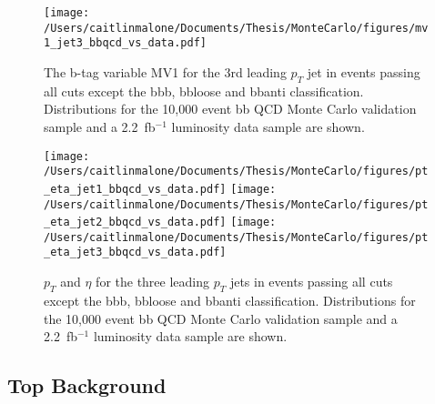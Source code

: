 \begin{figure}
  \texttt{[image: /Users/caitlinmalone/Documents/Thesis/MonteCarlo/figures/mv1\_jet3\_bbqcd\_vs\_data.pdf]}
  \caption{The b-tag variable MV1 for the 3rd leading $p_T$ jet in events passing all cuts except the
bbb, bbloose and bbanti classification.     Distributions for the 10,000 event bb QCD Monte Carlo validation sample
and a 2.2~fb$^{-1}$ luminosity data sample are shown.    \label{fig:mv1_jet3_bbqcd_vs_data}}
\end{figure}




\begin{figure}
  \texttt{[image: /Users/caitlinmalone/Documents/Thesis/MonteCarlo/figures/pt\_eta\_jet1\_bbqcd\_vs\_data.pdf]}
  \texttt{[image: /Users/caitlinmalone/Documents/Thesis/MonteCarlo/figures/pt\_eta\_jet2\_bbqcd\_vs\_data.pdf]}
  \texttt{[image: /Users/caitlinmalone/Documents/Thesis/MonteCarlo/figures/pt\_eta\_jet3\_bbqcd\_vs\_data.pdf]}
  \caption{$p_T$ and $\eta$ for the three leading $p_T$ jets in events passing all cuts except the
bbb, bbloose and bbanti classification.     Distributions for the 10,000 event bb QCD Monte Carlo validation sample                 
and a 2.2~fb$^{-1}$ luminosity data sample are shown.    \label{fig:pt_eta_bbqcd_vs_data}}                                          
\end{figure}                                                                                                                        



\subsection{Top Background}











